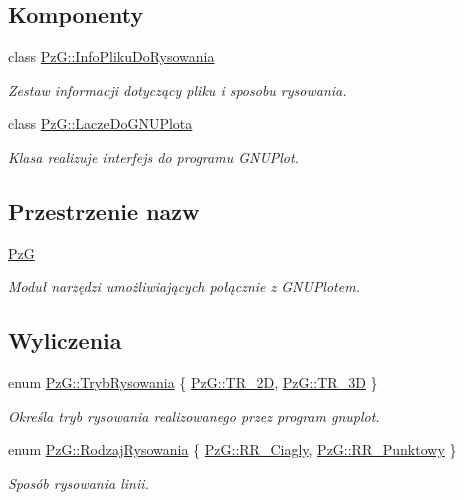 \subsection*{Komponenty}
\begin{DoxyCompactItemize}
\item 
class \mbox{\hyperlink{class_pz_g_1_1_info_pliku_do_rysowania}{Pz\+G\+::\+Info\+Pliku\+Do\+Rysowania}}
\begin{DoxyCompactList}\small\item\em Zestaw informacji dotyczący pliku i sposobu rysowania. \end{DoxyCompactList}\item 
class \mbox{\hyperlink{class_pz_g_1_1_lacze_do_g_n_u_plota}{Pz\+G\+::\+Lacze\+Do\+G\+N\+U\+Plota}}
\begin{DoxyCompactList}\small\item\em Klasa realizuje interfejs do programu G\+N\+U\+Plot. \end{DoxyCompactList}\end{DoxyCompactItemize}
\subsection*{Przestrzenie nazw}
\begin{DoxyCompactItemize}
\item 
 \mbox{\hyperlink{namespace_pz_g}{PzG}}
\begin{DoxyCompactList}\small\item\em Moduł narzędzi umożliwiających połącznie z G\+N\+U\+Plotem. \end{DoxyCompactList}\end{DoxyCompactItemize}
\subsection*{Wyliczenia}
\begin{DoxyCompactItemize}
\item 
enum \mbox{\hyperlink{namespace_pz_g_aeedae1ef10c66d720f9e89de408ca4ca}{Pz\+G\+::\+Tryb\+Rysowania}} \{ \mbox{\hyperlink{namespace_pz_g_aeedae1ef10c66d720f9e89de408ca4caa5eb0cf8b3405e136f092efdb489d60c4}{Pz\+G\+::\+T\+R\+\_\+2D}}, 
\mbox{\hyperlink{namespace_pz_g_aeedae1ef10c66d720f9e89de408ca4caa856e6b0fa6b8a9dc184c60cf27dcc5d2}{Pz\+G\+::\+T\+R\+\_\+3D}}
 \}
\begin{DoxyCompactList}\small\item\em Określa tryb rysowania realizowanego przez program {\ttfamily gnuplot}. \end{DoxyCompactList}\item 
enum \mbox{\hyperlink{namespace_pz_g_a705c92106f39b7d0c34a6739d10ff0b6}{Pz\+G\+::\+Rodzaj\+Rysowania}} \{ \mbox{\hyperlink{namespace_pz_g_a705c92106f39b7d0c34a6739d10ff0b6a927eaa159aa4bd3198f0a330b967746d}{Pz\+G\+::\+R\+R\+\_\+\+Ciagly}}, 
\mbox{\hyperlink{namespace_pz_g_a705c92106f39b7d0c34a6739d10ff0b6aa01097ee8266d6402b752ef6f9a4690c}{Pz\+G\+::\+R\+R\+\_\+\+Punktowy}}
 \}
\begin{DoxyCompactList}\small\item\em Sposób rysowania linii. \end{DoxyCompactList}\end{DoxyCompactItemize}



